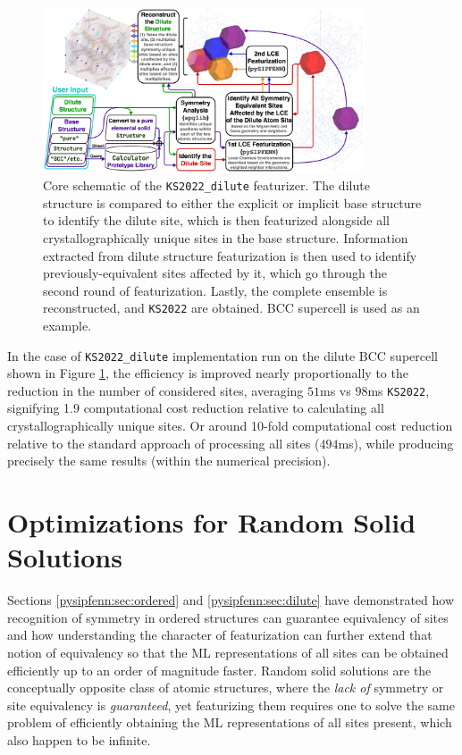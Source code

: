 \begin{figure}[h]
    \centering
    \includegraphics[width=0.85\textwidth]{pysipfenn/KS2022_dilute.png}
    \caption{Core schematic of the \texttt{KS2022\_dilute} featurizer. The dilute structure is compared to either the explicit or implicit base structure to identify the dilute site, which is then featurized alongside all crystallographically unique sites in the base structure. Information extracted from dilute structure featurization is then used to identify previously-equivalent sites affected by it, which go through the second round of featurization. Lastly, the complete ensemble is reconstructed, and \texttt{KS2022} are obtained. BCC supercell is used as an example.}
    \label{pysipfenn:fig:KS2022dilute}
\end{figure}

In the case of \texttt{KS2022\_dilute} implementation run on the dilute BCC supercell shown in Figure \ref{pysipfenn:fig:KS2022dilute}, the efficiency is improved nearly proportionally to the reduction in the number of considered sites, averaging $51$ms vs $98$ms \texttt{KS2022}, signifying 1.9 computational cost reduction relative to calculating all crystallographically unique sites. Or around 10-fold computational cost reduction relative to the standard \cite{Ward2017, Chen2019GraphCrystals, Jha2019IRNet, Krajewski2022ExtensibleNetworks, Choudhary2021AtomisticPredictions, Deng2023CHGNetModelling, Davariashtiyani2023FormationRepresentation, Schmidt2023Machine-Learning-AssistedMaterials} approach of processing all sites ($494$ms), while producing precisely the same results (within the numerical precision).


\section{Optimizations for Random Solid Solutions} \label{pysipfenn:sec:randomsolutions}

Sections \ref{pysipfenn:sec:ordered} and \ref{pysipfenn:sec:dilute} have demonstrated how recognition of symmetry in ordered structures can guarantee equivalency of sites and how understanding the character of featurization can further extend that notion of equivalency so that the ML representations of all sites can be obtained efficiently up to an order of magnitude faster. Random solid solutions are the conceptually opposite class of atomic structures, where the \emph{lack of} symmetry or site equivalency is \emph{guaranteed}, yet featurizing them requires one to solve the same problem of efficiently obtaining the ML representations of all sites present, which also happen to be infinite.

